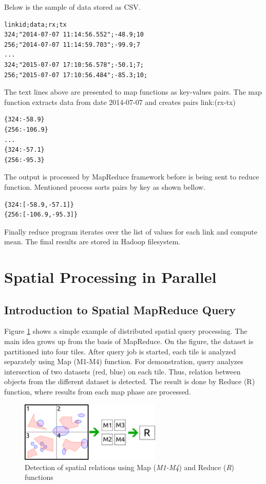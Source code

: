\documentclass[a4paper,12pt,oneside]{report}
\begin{document}
	Below is the sample of data stored as CSV.
	\begin{footnotesize}
		\begin{lstlisting}[style=mybash]
linkid;data;rx;tx
324;"2014-07-07 11:14:56.552";-48.9;10
256;"2014-07-07 11:14:59.703";-99.9;7
...
324;"2015-07-07 17:10:56.578";-50.1;7;
256;"2015-07-07 17:10:56.484";-85.3;10;
		\end{lstlisting}
	\end{footnotesize}
	The text lines above are presented to map functions as key-values pairs.
	The map function extracts data from date 2014-07-07 and creates pairs
	{link:(rx-tx)}
	\begin{footnotesize}
		\begin{lstlisting}[style=mybash]
{324:-58.9}
{256:-106.9}
...
{324:-57.1}
{256:-95.3}
		\end{lstlisting}
	\end{footnotesize}
	The output is processed by MapReduce framework before is being sent to reduce
	function.
	Mentioned process sorts pairs by key as shown bellow.
	\begin{footnotesize}
		\begin{lstlisting}[style=mybash]
{324:[-58.9,-57.1]}
{256:[-106.9,-95.3]}
		\end{lstlisting}\end{footnotesize}
	Finally reduce program iterates over the list of values for each link and
	compute mean.
	The final results are stored in Hadoop filesystem.

	
	\section{Spatial Processing in Parallel}
	\subsection{Introduction to Spatial MapReduce Query}
	Figure \ref{fig:mapred_spatial} shows a simple example of distributed spatial
	query processing. The main idea 
	grows up from the basis of MapReduce. On the figure, the dataset is partitioned
	into four tiles. After 
	query job is started, each tile is analyzed separately using Map (M1-M4)
	function. For demonstration, 
	query analyzes intersection of two datasets (red, blue) on each tile. Thus,
	relation between 
	objects from the different dataset is detected. The result is done by Reduce (R)
	function, where results from each
	map phase are processed.
	
	\begin{figure}[h!]
		\centering
		\includegraphics[width=0.6\textwidth]{./img/mapred_spatial.pdf}
		\caption[Spatial MapReduce]{\centering Detection of spatial relations using
			Map (\textit{M1-M4}) and Reduce (\textit{R}) functions}
		\label{fig:mapred_spatial}
	\end{figure}
\end{document}
